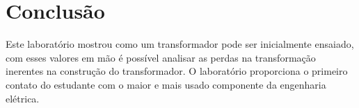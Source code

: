 \documentclass[conference]{IEEEtran}
\begin{document}
\section{Conclusão}

Este laboratório mostrou como um transformador pode ser inicialmente ensaiado, 
com esses valores em mão é possível analisar as perdas na transformação inerentes
na construção do transformador. O laboratório proporciona o primeiro contato
do estudante com o maior e mais usado componente da engenharia elétrica.












%
%
%






\end{document}
